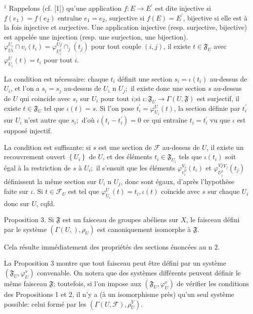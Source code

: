 ${ }^{1}$ Rappelons (cf. [1]) qu'une application $f: E \rightarrow E^{\prime}$ est dite injective si $f\left(e_{1}\right)=f\left(e_{2}\right)$ entraîne $e_{1}=e_{2}$, surjective si $f(E)=E^{\prime}$, bijective si elle est à la fois injective et surjective. Une application injective (resp. surjective, bijective) est appelée une injection (resp. une surjection, une bijection). $\varphi_{U i}^{U_{i}} \cap v_{i}\left(t_{i}\right)=\varphi_{U_{i}^{j}}^{U j} \cap_{j}\left(t_{j}\right)$ pour tout couple $(i, j)$, il existe $t \in \mathfrak{F}_{U}$ avec $\varphi_{U_{i}}^{U}(t)=t_{i}$ pour tout $i$.

La condition est nécessaire: chaque $t_{i}$ définit une section $s_{i}=\iota\left(t_{i}\right)$ au-dessus de $U_{i}$, et l'on a $s_{i}=s_{j}$ au-dessus de $U_{i}$ n $U_{j} ;$ il existe donc une section $s$ au-dessus de $U$ qui coincide avec $s_{i}$ sur $U_{i}$ pour tout $i$;si $\iota: \mathfrak{F}_{U} \rightarrow \Gamma(U, \mathfrak{F})$ est surjectif, il existe $t \in \mathfrak{F}_{U}$ tel que $\iota(t)=s .$ Si l'on pose $t_{i}^{\prime}=\varphi_{U_{i}}^{U}(t)$, la section définie par $t_{i}^{\prime}$ sur $U_{i}$ n'est autre que $s_{i} ;$ d'où $\iota\left(t_{i}-t_{i}^{\prime}\right)=0$ ce qui entraîne $t_{i}=t_{i}^{\prime}$ vu que $\iota$ est supposé injectif.

La condition est suffisante: si $s$ est une section de $\mathcal{F}$ au-dessus de $U$, il existe un recouvrement ouvert $\left\{U_{i}\right\}$ de $U$, et des éléments $t_{i} \in \mathfrak{F}_{U_{i}}$ tels que $\iota\left(t_{i}\right)$ soit égal à la restriction de $s$ à $U_{i} ;$ il s'ensuit que les éléments $\varphi_{v_{i}^{V}}^{V_{v}}\left(t_{i}\right)$ et $\varphi_{U_{i}^{j}}^{V j}{ }^{V_{j}}\left(t_{j}\right)$ définissent la même section sur $U_{i}$ n $U_{j}$, donc sont égaux, d'après l'hypothèse faite sur $\iota$. Si $t \in \mathcal{F}_{U}$ est tel que $\varphi_{U_{i}}^{U}(t)=t_{i}, \iota(t)$ coïncide avec $s$ sur chaque $U_{i}$ donc sur $U$, cqfd.

Proposition $3 .$ Si $\mathfrak{F}$ est un faisceau de groupes abéliens sur $X$, le faisceau défini par le système $\left(\Gamma(U, \mathfrak{}), \rho_{U}\right)$ est canoniquement isomorphe à $\mathfrak{F}$.

Cela résulte immédiatement des propriétés des sections énoncées au n $2 .$

La Proposition 3 montre que tout faisceau peut être défini par un système $\left(\mathfrak{F}_{U}, \varphi_{U}^{v}\right)$ convenable. On notera que des systèmes différents peuvent définir le même faisceau $\mathfrak{F}$; toutefois, si l'on impose aux $\left(\mathfrak{F}_{U}, \varphi_{U}^{v}\right)$ de vérifier les conditions des Propositions 1 et 2, il n'y a (à un isomorphisme près) qu'un seul système possible: celui formé par les $\left(\Gamma(U, \mathcal{F}), \rho_{U}^{V}\right)$.

